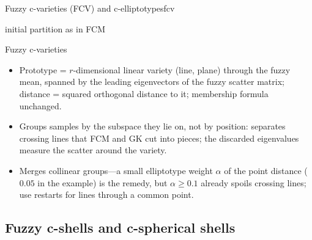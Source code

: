 \begin{algobox}{Fuzzy c-varieties (FCV) and c-elliptotypes}{fcv}
\begin{algorithm}[H]
initial partition as in FCM\;
\end{algorithm}
\end{algobox}
\begin{summarybox}{Fuzzy c-varieties}
\begin{itemize}
  \item Prototype = $r$-dimensional linear variety (line, plane) through the fuzzy mean, spanned by the leading eigenvectors of the fuzzy scatter matrix; distance = squared orthogonal distance to it; membership formula unchanged.
  \item Groups samples by the subspace they lie on, not by position: separates crossing lines that FCM and GK cut into pieces; the discarded eigenvalues measure the scatter around the variety.
  \item Merges collinear groups---a small elliptotype weight $\alpha$ of the point distance ($0.05$ in the example) is the remedy, but $\alpha\ge0.1$ already spoils crossing lines; use restarts for lines through a common point.
\end{itemize}
\end{summarybox}

\subsection{Fuzzy c-shells and c-spherical shells}\label{sec:robust:shells}

